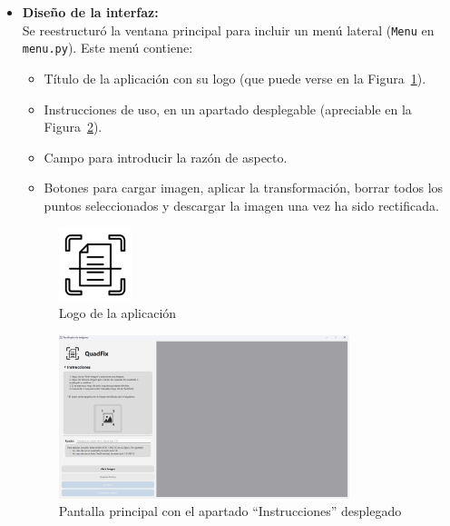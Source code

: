 \begin{itemize}
    \item \textbf{Diseño de la interfaz:} \\
    Se reestructuró la ventana principal para incluir un menú lateral (\texttt{Menu} en \texttt{menu.py}). Este menú contiene:
    \begin{itemize}
        \item Título de la aplicación con su logo (que puede verse en la Figura~\ref{fg:logo}).
        \item Instrucciones de uso, en un apartado desplegable (apreciable en la Figura~\ref{fg:instructions}).
        \item Campo para introducir la razón de aspecto.
        \item Botones para cargar imagen, aplicar la transformación, borrar todos los puntos seleccionados y descargar la imagen una vez ha sido rectificada.
    \end{itemize}
    
    \begin{figure}[H]
        \centering	\includegraphics[width=0.2\textwidth]{figures/3.3.LogoDark.png}
        \caption{Logo de la aplicación}\label{fg:logo}
    \end{figure}
    
    \begin{figure}[H]
        \centering	\includegraphics[width=0.8\textwidth]{figures/3.3.Instrucciones.png}
        \caption{Pantalla principal con el apartado ``Instrucciones'' desplegado}\label{fg:instructions}
    \end{figure}
    

\end{itemize}
